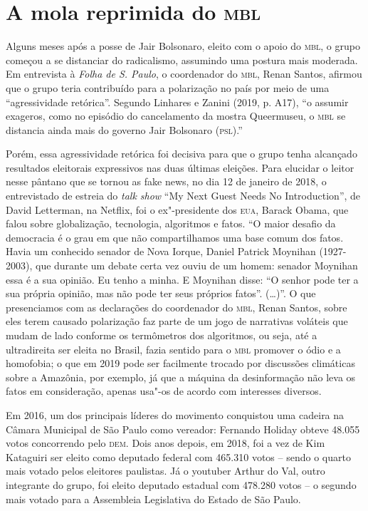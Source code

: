 \section{A mola reprimida do \textsc{mbl}}

\noindent{}Alguns meses após a posse de Jair Bolsonaro, eleito com o apoio do \textsc{mbl},
o grupo começou a se distanciar do radicalismo, assumindo uma postura
mais moderada. Em entrevista à \emph{Folha de S. Paulo}, o coordenador
do \textsc{mbl}, Renan Santos, afirmou que o grupo teria contribuído para a
polarização no país por meio de uma ``agressividade retórica''. Segundo
Linhares e Zanini (2019, p. A17), ``o assumir exageros, como no episódio
do cancelamento da mostra Queermuseu, o \textsc{mbl} se distancia ainda mais do
governo Jair Bolsonaro (\textsc{psl}).''

Porém, essa agressividade retórica foi decisiva para que o grupo tenha
alcançado resultados eleitorais expressivos nas duas últimas eleições.
Para elucidar o leitor nesse pântano que se tornou as fake news, no dia
12 de janeiro de 2018, o entrevistado de estreia do \emph{talk show} ``My Next
Guest Needs No Introduction'', de David Letterman, na Netflix, foi o
ex"-presidente dos \textsc{eua}, Barack Obama, que falou sobre globalização,
tecnologia, algoritmos e fatos. ``O maior desafio da democracia é o grau
em que não compartilhamos uma base comum dos fatos. Havia um conhecido
senador de Nova Iorque, Daniel Patrick Moynihan (1927-2003), que durante
um debate certa vez ouviu de um homem: senador Moynihan essa é a sua
opinião. Eu tenho a minha. E Moynihan disse: ``O senhor pode ter a sua
própria opinião, mas não pode ter seus próprios fatos''. (\ldots{})''. O que
presenciamos com as declarações do coordenador do \textsc{mbl}, Renan Santos,
sobre eles terem causado polarização faz parte de um jogo de narrativas
voláteis que mudam de lado conforme os termômetros dos algoritmos, ou
seja, até a ultradireita ser eleita no Brasil, fazia sentido para o \textsc{mbl}
promover o ódio e a homofobia; o que em 2019 pode ser facilmente trocado
por discussões climáticas sobre a Amazônia, por exemplo, já que a
máquina da desinformação não leva os fatos em consideração, apenas
usa"-os de acordo com interesses diversos.

Em 2016, um dos principais líderes do movimento conquistou uma cadeira
na Câmara Municipal de São Paulo como vereador: Fernando Holiday obteve
48.055 votos concorrendo pelo \textsc{dem}. Dois anos depois, em 2018, foi a vez
de Kim Kataguiri ser eleito como deputado federal com 465.310 votos --
sendo o quarto mais votado pelos eleitores paulistas. Já o youtuber
Arthur do Val, outro integrante do grupo, foi eleito deputado estadual
com 478.280 votos -- o segundo mais votado para a Assembleia Legislativa
do Estado de São Paulo.

